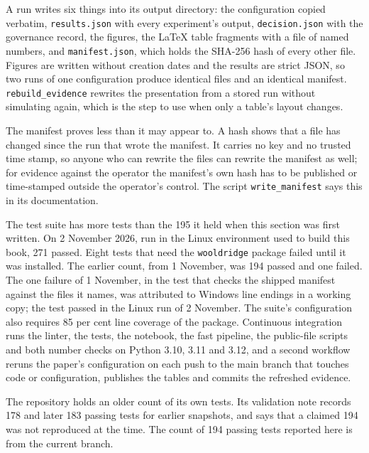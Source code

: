 A run writes six things into its output directory: the configuration copied verbatim,
\texttt{results.\allowbreak{}json} with every experiment's output, \texttt{decision.\allowbreak{}json} with the
governance record, the figures, the LaTeX table fragments with a file of named numbers,
and \texttt{manifest.\allowbreak{}json}, which holds the SHA-256 hash of every other file. Figures
are written without creation dates and the results are strict JSON, so two runs of one
configuration produce identical files and an identical manifest.
\texttt{rebuild\_\allowbreak{}evidence} rewrites the presentation from a stored run without
simulating again, which is the step to use when only a table's layout changes.

The manifest proves less than it may appear to. A hash shows that a file has changed
since the run that wrote the manifest. It carries no key and no trusted time stamp, so
anyone who can rewrite the files can rewrite the manifest as well; for evidence against
the operator the manifest's own hash has to be published or time-stamped outside the
operator's control. The script \texttt{write\_\allowbreak{}manifest} says this in its documentation.

The test suite has more tests than the 195 it held when this section was first
written. On 2 November 2026, run in the Linux environment used to build this book, 271
passed. Eight tests that need the \texttt{wooldridge} package failed until it was
installed. The earlier count, from 1 November, was 194 passed and one failed.
The one failure of 1 November, in the test that checks the shipped manifest against the
files it names, was attributed to Windows line endings in a working copy; the test passed in the
Linux run of 2 November. The suite's configuration also requires 85 per cent
line coverage of the package. %
Continuous integration runs the linter, the tests, the notebook, the fast pipeline,
the public-file scripts and both number checks on Python 3.10, 3.11 and 3.12, and a
second workflow reruns the paper's configuration on each push to the main branch that
touches code or configuration, publishes the tables and commits the refreshed
evidence. %

The repository holds an older count of its own tests. Its validation note records 178
and later 183 passing tests for earlier snapshots, and says that a claimed 194 was not
reproduced at the time. %
The count of 194 passing tests reported here is from the current branch.

